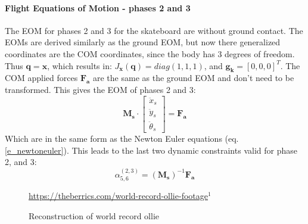 \paragraph{Flight Equations of Motion - phases 2 and 3}
\noindent The EOM for phases 2 and 3 for the skateboard are without ground contact. The EOMs are derived similarly as the ground EOM, but now there generalized coordinates are the COM coordinates, since the body has 3 degrees of freedom. Thus $\mathbf{q} = \mathbf{x}$, which results in: $J_{\mathbf{\dot x}} \left(\mathbf{q}\right) = diag(1,1,1)$, and $\mathbf{g_k} = [0, 0, 0]^T$.  The COM applied forces $\mathbf{F_a}$ are the same as the ground EOM and don't need to be transformed. This gives the EOM of phases 2 and 3:
\begin{equation}\label{e_eomb}
\mathbf{M_s} \cdot \left[\begin{array}{c}
         \ddot x_s  \\
         \ddot y_s \\
         \ddot \theta_s 
    \end{array}\right] =  \mathbf{F_a}
\end{equation}
Which are in the same form as the Newton Euler equations (eq. \ref{e_newtoneuler}). This leads to the last two dynamic constraints valid for phase 2, and 3:
\begin{equation}
    \alpha_{5,6}^{(2,3)} = (\mathbf{M_s})^{-1}\mathbf{F_a}
\end{equation}
\begin{figure}[b]%
    \centering
    \quad
    \caption{Reconstruction of world record ollie} 
    \label{fig:f_record}
    \centering \footnotesize \url{https://theberrics.com/world-record-ollie-footage}$^{1}$%
\end{figure}
